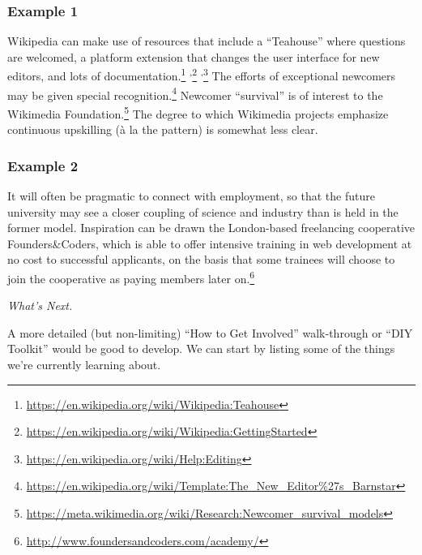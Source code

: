 \subsubsection*{Example 1} Wikipedia  can make use of resources that
include a ``Teahouse'' where questions are welcomed, a platform extension that changes the user
interface for new editors, and lots of documentation.\footnote{\url{https://en.wikipedia.org/wiki/Wikipedia:Teahouse}}%
\textsuperscript{,}\footnote{\url{https://en.wikipedia.org/wiki/Wikipedia:GettingStarted}}%
\textsuperscript{,}\footnote{\url{https://en.wikipedia.org/wiki/Help:Editing}}
The efforts of exceptional newcomers may be given special
recognition.\footnote{\url{https://en.wikipedia.org/wiki/Template:The_New_Editor\%27s_Barnstar}}
Newcomer ``survival'' is of interest to the Wikimedia
Foundation.\footnote{\url{https://meta.wikimedia.org/wiki/Research:Newcomer_survival_models}}
The degree to which Wikimedia projects emphasize continuous upskilling
(\`a la the  pattern) is somewhat less clear.

\subsubsection*{Example 2} It will often be pragmatic to connect
 with employment, so that the future
university may see a closer coupling of science and industry than is
held in the former model.  Inspiration can be drawn the London-based freelancing cooperative Founders\&Coders, which is
able to offer intensive training in web development at no cost to
successful applicants, on the basis that some trainees will choose to
join the cooperative as paying members later
on.\footnote{\url{http://www.foundersandcoders.com/academy/}}


\begin{framed}
\noindent 
\emph{What's Next.}
\begin{collectinmacro}{\NewcomerWN}{}{}
A more detailed (but non-limiting) ``How to Get Involved'' walk-through or ``DIY Toolkit'' would be good to develop. We can start by listing some of the things we're currently learning about.
\end{collectinmacro}
\NewcomerWN
\end{framed}
